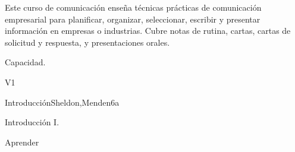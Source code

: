 
\begin{syllabus}


\begin{justification}
Este curso de comunicación enseña técnicas prácticas de comunicación empresarial para planificar, organizar, seleccionar, escribir y presentar información en empresas o industrias. Cubre notas de rutina, cartas, cartas de solicitud y respuesta, y presentaciones orales.
   \end{justification}
   
   \begin{goals}
   \item Capacidad.
   \end{goals}
   
   \begin{outcomes}{V1}
      \item {}
   \end{outcomes}
   
   \begin{unit}{Introducción}{}{Sheldon,Menden}{6}{a}
   \begin{topics}
         \item Introducción I.
      \end{topics}
   
      \begin{learningoutcomes}
         \item Aprender
      \end{learningoutcomes}
   \end{unit}
   
   
   
   
   
   
   \begin{coursebibliography}
   \end{coursebibliography}
   
   \end{syllabus}
   
